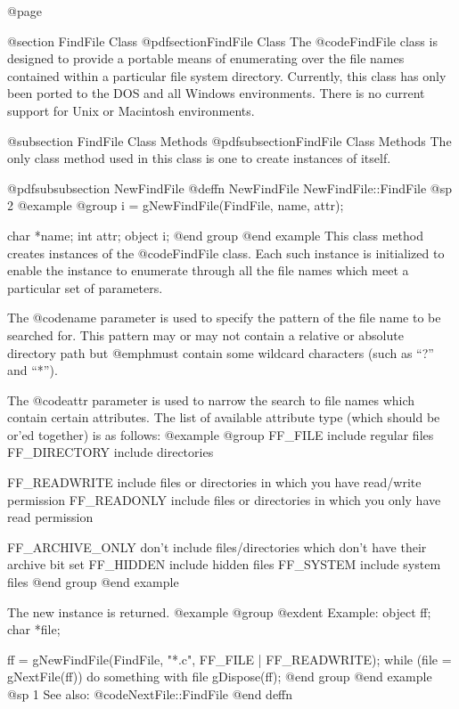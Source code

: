 @page

@section FindFile Class
@pdfsection{FindFile Class}
The @code{FindFile} class is designed to provide a portable means of
enumerating over the file names contained within a particular file
system directory.  Currently, this class has only been ported to the DOS
and all Windows environments.  There is no current support for Unix or
Macintosh environments.




@subsection FindFile Class Methods
@pdfsubsection{FindFile Class Methods}
The only class method used in this class is one to create instances of itself.





@pdfsubsubsection {NewFindFile}
@deffn {NewFindFile} NewFindFile::FindFile
@sp 2
@example
@group
i = gNewFindFile(FindFile, name, attr);

char    *name;
int     attr;
object  i;
@end group
@end example
This class method creates instances of the @code{FindFile} class.  Each
such instance is initialized to enable the instance to enumerate through
all the file names which meet a particular set of parameters.

The @code{name} parameter is used to specify the pattern of the file name
to be searched for.  This pattern may or may not contain a relative or
absolute directory path but @emph{must} contain some wildcard
characters (such as ``?'' and ``*'').

The @code{attr} parameter is used to narrow the search to file names
which contain certain attributes.  The list of available attribute
type (which should be or'ed together) is as follows:
@example
@group
FF_FILE                 include regular files
FF_DIRECTORY            include directories

FF_READWRITE            include files or directories in which
                        you have read/write permission
FF_READONLY             include files or directories in which
                        you only have read permission

FF_ARCHIVE_ONLY         don't include files/directories which
                        don't have their archive bit set
FF_HIDDEN               include hidden files
FF_SYSTEM               include system files
@end group
@end example

The new instance is returned.  
@example
@group
@exdent Example:
object  ff;
char    *file;

ff = gNewFindFile(FindFile, "*.c", FF_FILE | FF_READWRITE);
while (file = gNextFile(ff))  {
        do something with file
}
gDispose(ff);
@end group
@end example
@sp 1
See also:  @code{NextFile::FindFile}
@end deffn






